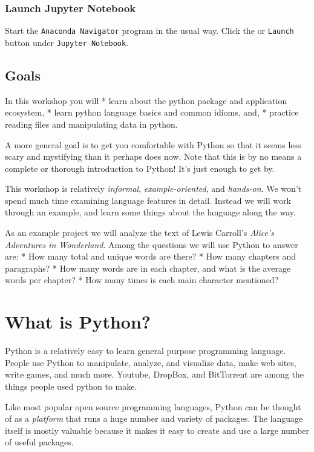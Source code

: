 \documentclass[]{book}
\begin{document}
\subsubsection{Launch Jupyter Notebook}\label{launch-jupyter-notebook}

Start the \texttt{Anaconda\ Navigator} program in the usual way. Click
the or \texttt{Launch} button under \texttt{Jupyter\ Notebook}.

\subsection{Goals}\label{goals-4}

In this workshop you will * learn about the python package and
application ecosystem, * learn python language basics and common idioms,
and, * practice reading files and manipulating data in python.

A more general goal is to get you comfortable with Python so that it
seems less scary and mystifying than it perhaps does now. Note that this
is by no means a complete or thorough introduction to Python! It's just
enough to get by.

This workshop is relatively \emph{informal}, \emph{example-oriented},
and \emph{hands-on}. We won't spend much time examining language
features in detail. Instead we will work through an example, and learn
some things about the language along the way.

As an example project we will analyze the text of Lewis Carroll's
\emph{Alice's Adventures in Wonderland}. Among the questions we will use
Python to answer are: * How many total and unique words are there? * How
many chapters and paragraphs? * How many words are in each chapter, and
what is the average words per chapter? * How many times is each main
character mentioned?

\section{What is Python?}\label{what-is-python}

Python is a relatively easy to learn general purpose programming
language. People use Python to manipulate, analyze, and visualize data,
make web sites, write games, and much more. Youtube, DropBox, and
BitTorrent are among the things people used python to make.

Like most popular open source programming languages, Python can be
thought of as a \emph{platform} that runs a huge number and variety of
packages. The language itself is mostly valuable because it makes it
easy to create and use a large number of useful packages.
\end{document}
